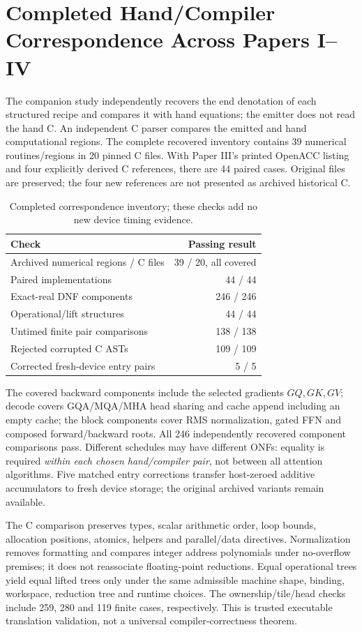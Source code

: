 \documentclass[sigplan,10pt,review,anonymous,balance=false,pbalance=false]{acmart}
\begin{document}
\section{Completed Hand/Compiler Correspondence Across Papers I--IV}
\label{sec:completed-suite}
The companion study independently recovers the end denotation of each structured recipe and compares it with hand equations; the emitter does not read the hand C. An independent C parser compares the emitted and hand computational regions. The complete recovered inventory contains 39 numerical routines/regions in 20 pinned C files. With Paper III's printed OpenACC listing and four explicitly derived C references, there are 44 paired cases. Original files are preserved; the four new references are not presented as archived historical C.

\begin{table}[t]\centering\footnotesize
\caption{Completed correspondence inventory; these checks add no new device timing evidence.}\label{tab:completed-suite}
\begin{tabular}{@{}lr@{}}\toprule
Check & Passing result\\\midrule
Archived numerical regions / C files & 39 / 20, all covered\\
Paired implementations & 44 / 44\\
Exact-real DNF components & 246 / 246\\
Operational/lift structures & 44 / 44\\
Untimed finite pair comparisons & 138 / 138\\
Rejected corrupted C ASTs & 109 / 109\\
Corrected fresh-device entry pairs & 5 / 5\\\bottomrule
\end{tabular}\end{table}

The covered backward components include the selected gradients $GQ,GK,GV$; decode covers GQA/MQA/MHA head sharing and cache append including an empty cache; the block components cover RMS normalization, gated FFN and composed forward/backward roots. All 246 independently recovered component comparisons pass. Different schedules may have different ONFs: equality is required \emph{within each chosen hand/compiler pair}, not between all attention algorithms. Five matched entry corrections transfer host-zeroed additive accumulators to fresh device storage; the original archived variants remain available.

The C comparison preserves types, scalar arithmetic order, loop bounds, allocation positions, atomics, helpers and parallel/data directives. Normalization removes formatting and compares integer address polynomials under no-overflow premises; it does not reassociate floating-point reductions. Equal operational trees yield equal lifted trees only under the same admissible machine shape, binding, workspace, reduction tree and runtime choices. The ownership/tile/head checks include 259, 280 and 119 finite cases, respectively. This is trusted executable translation validation, not a universal compiler-correctness theorem.
\end{document}
